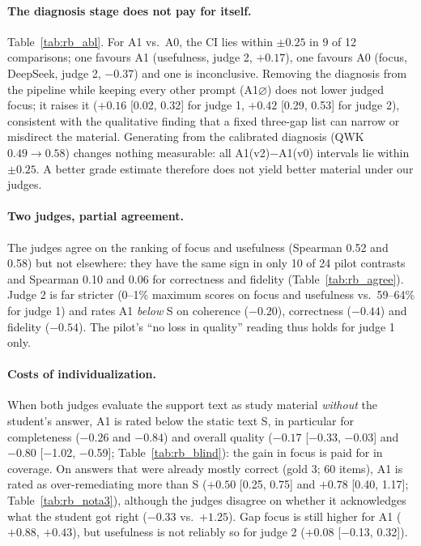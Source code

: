 \documentclass[11pt]{article}
\begin{document}
\paragraph{The diagnosis stage does not pay for itself.} Table~\ref{tab:rb_abl}. For A1 vs.\ A0, the CI lies within $\pm 0.25$ in 9 of 12 comparisons; one favours A1 (usefulness, judge 2, $+0.17$), one favours A0 (focus, DeepSeek, judge 2, $-0.37$) and one is inconclusive. Removing the diagnosis from the pipeline while keeping every other prompt (A1$\varnothing$) does not lower judged focus; it raises it ($+0.16$ [0.02, 0.32] for judge 1, $+0.42$ [0.29, 0.53] for judge 2), consistent with the qualitative finding that a fixed three-gap list can narrow or misdirect the material. Generating from the calibrated diagnosis (QWK $0.49\to0.58$) changes nothing measurable: all A1(v2)$-$A1(v0) intervals lie within $\pm 0.25$. A better grade estimate therefore does not yield better material under our judges.

\begin{table}[t]
\centering\footnotesize

\caption{Is the explicit diagnosis needed? Differences in judge scores (1--5) with 95\% question-clustered CIs. A1$\varnothing$: the A1 prompts with an empty diagnosis; A1(v2): generation from the calibrated diagnosis.}
\label{tab:rb_abl}
\end{table}

\paragraph{Two judges, partial agreement.} The judges agree on the ranking of focus and usefulness (Spearman 0.52 and 0.58) but not elsewhere: they have the same sign in only 10 of 24 pilot contrasts and Spearman 0.10 and 0.06 for correctness and fidelity (Table~\ref{tab:rb_agree}). Judge 2 is far stricter (0--1\% maximum scores on focus and usefulness vs.\ 59--64\% for judge 1) and rates A1 \emph{below} S on coherence ($-0.20$), correctness ($-0.44$) and fidelity ($-0.54$). The pilot's ``no loss in quality'' reading thus holds for judge 1 only.

\paragraph{Costs of individualization.} When both judges evaluate the support text as study material \emph{without} the student's answer, A1 is rated below the static text S, in particular for completeness ($-0.26$ and $-0.84$) and overall quality ($-0.17$ [$-$0.33, $-$0.03] and $-0.80$ [$-$1.02, $-$0.59]; Table~\ref{tab:rb_blind}): the gain in focus is paid for in coverage. On answers that were already mostly correct (gold 3; 60 items), A1 is rated as over-remediating more than S ($+0.50$ [0.25, 0.75] and $+0.78$ [0.40, 1.17]; Table~\ref{tab:rb_nota3}), although the judges disagree on whether it acknowledges what the student got right ($-0.33$ vs.\ $+1.25$). Gap focus is still higher for A1 ($+0.88$, $+0.43$), but usefulness is not reliably so for judge 2 ($+0.08$ [$-$0.13, 0.32]).
\end{document}
